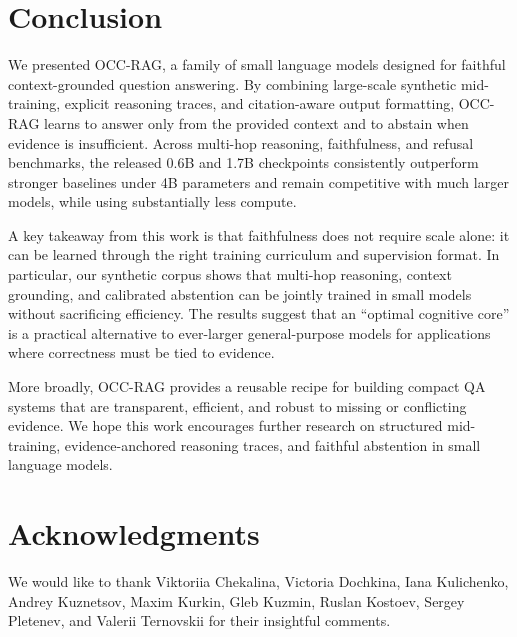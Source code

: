 \documentclass{llmxive}
\begin{document}
\section{Conclusion}
We presented OCC-RAG, a family of small language models designed for faithful context-grounded question answering. By combining large-scale synthetic mid-training, explicit reasoning traces, and citation-aware output formatting, OCC-RAG learns to answer only from the provided context and to abstain when evidence is insufficient. Across multi-hop reasoning, faithfulness, and refusal benchmarks, the released 0.6B and 1.7B checkpoints consistently outperform stronger baselines under 4B parameters and remain competitive with much larger models, while using substantially less compute.

A key takeaway from this work is that faithfulness does not require scale alone: it can be learned through the right training curriculum and supervision format. In particular, our synthetic corpus shows that multi-hop reasoning, context grounding, and calibrated abstention can be jointly trained in small models without sacrificing efficiency. The results suggest that an ``optimal cognitive core'' is a practical alternative to ever-larger general-purpose models for applications where correctness must be tied to evidence.

More broadly, OCC-RAG provides a reusable recipe for building compact QA systems that are transparent, efficient, and robust to missing or conflicting evidence. We hope this work encourages further research on structured mid-training, evidence-anchored reasoning traces, and faithful abstention in small language models.

\section{Acknowledgments}
We would like to thank Viktoriia Chekalina, Victoria Dochkina, Iana Kulichenko, Andrey Kuznetsov, Maxim Kurkin, Gleb Kuzmin, Ruslan Kostoev, Sergey Pletenev, and Valerii Ternovskii for their insightful comments.





\appendix
\end{document}

